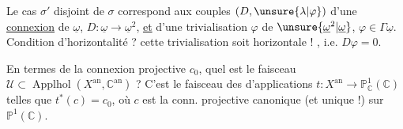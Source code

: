 Le cas $\sigma'$ disjoint de $\sigma$ correspond aux couples $(D,\unsure{\lambda|\varphi})$ d'une \uline{connexion} de $\underline\omega$, $D:\underline\omega\longrightarrow\underline\omega^2$, \uline{et} d'une trivialisation $\varphi$ de $\unsure{\underline\omega^2|\underline\omega}$, $\varphi\in\Gamma\underline\omega$.
Condition d'horizontalité ?  cette trivialisation soit horizontale !  , i.e. $D\varphi=0$.

En termes de la connexion projective $c_0$, quel est le faisceau $\mathcal U\subset\operatorname{Applhol}(X^{\mathrm{an}},\mathbb C^{\mathrm{an}})$ ? C'est le faisceau des  d'applications  $t:X^{\mathrm{an}}\longrightarrow\mathbb P^1_{\mathbb C}(\mathbb C)$ telles que $t^*(c)=c_0$, où $c$ est la conn. projective canonique (et unique !) sur $\mathbb P^1(\mathbb C)$.

